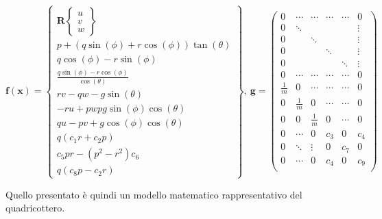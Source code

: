 \begin{equation}\label{eq:SistemaQuadrirotore_statespaceElement}
	\mathbf{f(x)} = \begin{Bmatrix}
		\mathbf{R} \begin{Bmatrix}
			u \\ v \\ w
		\end{Bmatrix} \\
		p + (q\sin(\phi)+r\cos(\phi))\tan(\theta) \\
		q\cos(\phi) - r\sin(\phi) \\
		\frac{q\sin(\phi) - r\cos(\phi)}{\cos(\theta)}\\
		rv-qw-g\sin(\theta)\\
		-ru + pw p g \sin(\phi)\cos(\theta)\\
		qu - pv + g \cos(\phi)\cos(\theta)\\
		q (c_1 r + c_2 p)\\
		c_5 pr - (p^2-r^2) c_6 \\
		q(c_8 p - c_2 r)
	\end{Bmatrix}, \ \mathbf{g} =
	\begin{pmatrix}
		0 & \cdots & \cdots & \cdots & \cdots & 0 \\
		0 & \ddots & & & & \vdots \\
		0 & & \ddots & & & \vdots \\
		0 & & & \ddots & & \vdots \\
		0 & & & & \ddots & \vdots \\
		0 & \cdots & \cdots & \cdots & \cdots & 0 \\
		\frac{1}{m} & 0 & \cdots & \cdots & \cdots & 0 \\
		0 & \frac{1}{m} & 0 & \cdots & \cdots & 0 \\
		0 & 0 & \frac{1}{m} & 0 & \cdots & 0 \\
		0 & \cdots & 0 & c_3 & 0 & c_4 \\
		0 & \ddots & \vdots & 0 & c_7 & 0 \\
		0 & \cdots & 0 & c_4 & 0 & c_9 \\
	\end{pmatrix}
\end{equation}

Quello presentato è quindi un modello matematico rappresentativo del quadricottero.



